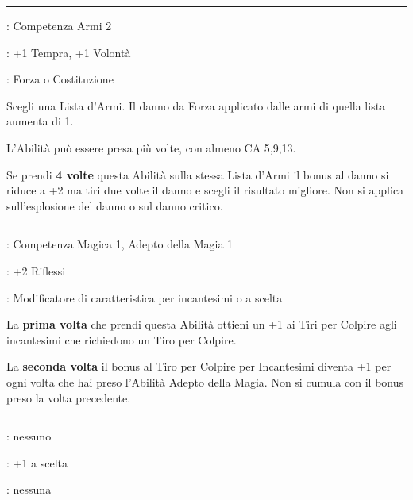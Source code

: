 \begin{multicols}{2}
\smallskip\noindent\rule{\linewidth}{2pt} \hypertarget{Un braccio, un arma}{}\medskip{}
\noindent
\begin{description}[noitemsep, topsep=0pt, parsep=0pt, partopsep=0pt, leftmargin=0cm, labelwidth=2.5cm]
    \item[\textbf{Requisito}]: Competenza Armi 2
    \item[\textbf{Tiri Salvezza}]: +1 Tempra, +1 Volontà
    \item[\textbf{Caratteristica}]: Forza o Costituzione
\end{description}

Scegli una Lista d'Armi. Il danno da Forza applicato dalle armi di quella lista aumenta di 1.

L’Abilità può essere presa più volte, con almeno CA 5,9,13.

Se prendi \textbf{4 volte} questa Abilità sulla stessa Lista d'Armi il bonus al danno si riduce a +2 ma tiri due volte il danno e scegli il risultato migliore. Non si applica sull'esplosione del danno o sul danno critico.

\smallskip\noindent\rule{\linewidth}{2pt} \hypertarget{Un colpo un morto}{}\medskip{}
\noindent
\begin{description}[noitemsep, topsep=0pt, parsep=0pt, partopsep=0pt, leftmargin=0cm, labelwidth=2.5cm]
    \item[\textbf{Requisito}]: Competenza Magica 1, Adepto della Magia 1
    \item[\textbf{Tiri Salvezza}]: +2 Riflessi
    \item[\textbf{Caratteristica}]: Modificatore di caratteristica per incantesimi o a scelta
\end{description}

La \textbf{prima volta} che prendi questa Abilità ottieni un +1 ai Tiri per Colpire agli incantesimi che richiedono un Tiro per Colpire.

La \textbf{seconda volta} il bonus al Tiro per Colpire per Incantesimi diventa +1 per ogni volta che hai preso l'Abilità Adepto della Magia. Non si cumula con il bonus preso la volta precedente.

\smallskip\noindent\rule{\linewidth}{2pt} \hypertarget{Un solo corpo, una sola mente, un solo spirito}{}\medskip{}
\noindent
\begin{description}[noitemsep, topsep=0pt, parsep=0pt, partopsep=0pt, leftmargin=0cm, labelwidth=2.5cm]
    \item[\textbf{Requisito}]: nessuno
    \item[\textbf{Tiri Salvezza}]:  +1 a scelta
    \item[\textbf{Caratteristica}]: nessuna
\end{description}


\end{multicols}
